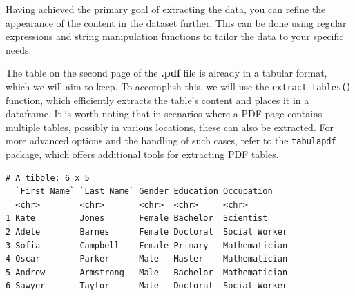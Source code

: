 Having achieved the primary goal of extracting the data, you can
refine the appearance of the content in the dataset further. This can be done
using regular expressions and string manipulation functions to tailor
the data to your specific needs.

The table on the second page of the \textbf{.pdf} file is already in a
tabular format, which we will aim to keep. To accomplish this, we will
use the \texttt{extract\_tables()} function, which efficiently extracts
the table's content and places it in a dataframe. It is worth noting that in scenarios
where a PDF page contains multiple tables, possibly in various
locations, these can also be extracted. For more advanced options and the
handling of such cases, refer to the \texttt{tabulapdf} package, which
offers additional tools for extracting PDF tables.

\begin{Shaded}
\begin{Highlighting}[]

\OtherTok{\textless{}{-}}  \NormalTok{, } \NormalTok{, } \NormalTok{)}

\OtherTok{\textless{}{-}}\NormalTok{ atable[[}\NormalTok{]]}

\end{Highlighting}
\end{Shaded}

\begin{verbatim}
# A tibble: 6 x 5
  `First Name` `Last Name` Gender Education Occupation   
  <chr>        <chr>       <chr>  <chr>     <chr>        
1 Kate         Jones       Female Bachelor  Scientist    
2 Adele        Barnes      Female Doctoral  Social Worker
3 Sofia        Campbell    Female Primary   Mathematician
4 Oscar        Parker      Male   Master    Mathematician
5 Andrew       Armstrong   Male   Bachelor  Mathematician
6 Sawyer       Taylor      Male   Doctoral  Social Worker
\end{verbatim}

